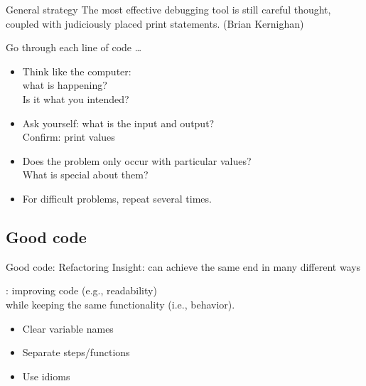 \documentclass[aspectratio=169,usenames,dvipsnames]{beamer}
\begin{document}
\begin{frame}{General strategy}
    The most effective debugging tool is still careful thought, coupled with
    judiciously placed print statements. (Brian Kernighan)
    
    \pause\vspace{1em}
    Go through each line of code \dots
    \begin{itemize}
        \item Think like the computer: \\
            what is happening? \\
            Is it what you intended?
        \item Ask yourself: what is the input and output? \\
            Confirm: print values
        \item Does the problem only occur with particular values? \\
            What is special about them?
        \item For difficult problems, repeat several times.
    \end{itemize}
\end{frame}



\subsection{Good code}
\begin{frame}{Good code: Refactoring}
	Insight: can achieve the same end in many different ways

	\pause
	\begin{definition}
		: improving code (e.g., readability) \\
			while keeping the same functionality (i.e., behavior).
	\end{definition}

    \begin{itemize}
        \item Clear variable names
        \item Separate steps/functions
        \item Use idioms
    \end{itemize}
\end{frame}
\end{document}
